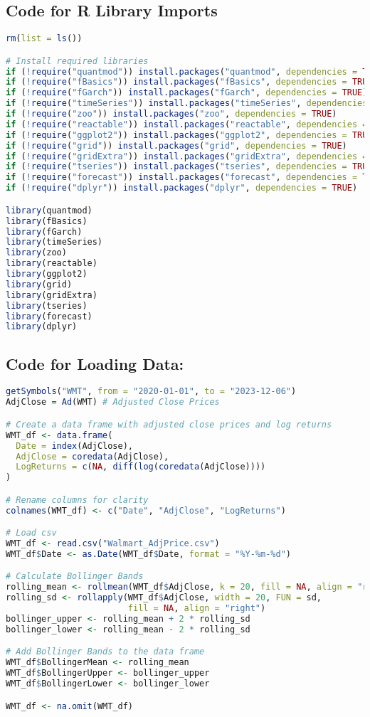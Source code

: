 \documentclass{article}
\newcommand{\1}{\mathbbm{1}}
\theoremstyle{definition}
\begin{document}
\subsection{Code for R Library Imports}
\label{subsec:library_imports}

\begin{lstlisting}[language=R]
rm(list = ls())

# Install required libraries
if (!require("quantmod")) install.packages("quantmod", dependencies = TRUE)
if (!require("fBasics")) install.packages("fBasics", dependencies = TRUE)
if (!require("fGarch")) install.packages("fGarch", dependencies = TRUE)
if (!require("timeSeries")) install.packages("timeSeries", dependencies = TRUE)
if (!require("zoo")) install.packages("zoo", dependencies = TRUE)
if (!require("reactable")) install.packages("reactable", dependencies = TRUE)
if (!require("ggplot2")) install.packages("ggplot2", dependencies = TRUE)
if (!require("grid")) install.packages("grid", dependencies = TRUE)
if (!require("gridExtra")) install.packages("gridExtra", dependencies = TRUE)
if (!require("tseries")) install.packages("tseries", dependencies = TRUE)
if (!require("forecast")) install.packages("forecast", dependencies = TRUE)
if (!require("dplyr")) install.packages("dplyr", dependencies = TRUE)

library(quantmod)
library(fBasics)
library(fGarch)
library(timeSeries)
library(zoo)
library(reactable)
library(ggplot2)
library(grid)
library(gridExtra)
library(tseries)
library(forecast)
library(dplyr)
\end{lstlisting}

\subsection{Code for Loading Data:}
\label{subsec:loading_data}

\begin{lstlisting}[language=R]
getSymbols("WMT", from = "2020-01-01", to = "2023-12-06") 
AdjClose = Ad(WMT) # Adjusted Close Prices

# Create a data frame with adjusted close prices and log returns
WMT_df <- data.frame(
  Date = index(AdjClose),
  AdjClose = coredata(AdjClose),
  LogReturns = c(NA, diff(log(coredata(AdjClose))))
)

# Rename columns for clarity
colnames(WMT_df) <- c("Date", "AdjClose", "LogReturns")

# Load csv
WMT_df <- read.csv("Walmart_AdjPrice.csv")
WMT_df$Date <- as.Date(WMT_df$Date, format = "%Y-%m-%d")

# Calculate Bollinger Bands
rolling_mean <- rollmean(WMT_df$AdjClose, k = 20, fill = NA, align = "right")
rolling_sd <- rollapply(WMT_df$AdjClose, width = 20, FUN = sd, 
                        fill = NA, align = "right")
bollinger_upper <- rolling_mean + 2 * rolling_sd
bollinger_lower <- rolling_mean - 2 * rolling_sd

# Add Bollinger Bands to the data frame
WMT_df$BollingerMean <- rolling_mean
WMT_df$BollingerUpper <- bollinger_upper
WMT_df$BollingerLower <- bollinger_lower

WMT_df <- na.omit(WMT_df)
\end{lstlisting}
\end{document}
